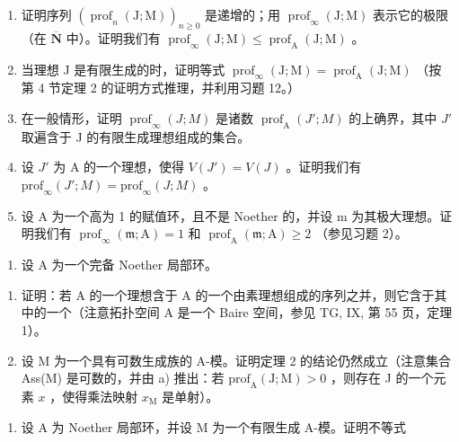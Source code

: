 \begin{enumerate}
\def\labelenumi{\alph{enumi})}
\item
  证明序列 \(\left(\operatorname{prof}_{n}(\mathrm{J};\mathrm{M})\right)_{n\geqslant0}\) 是递增的；用 \(\operatorname{prof}_{\infty}(\mathrm{J};\mathrm{M})\) 表示它的极限（在 \(\overline{\mathbf{N}}\) 中）。证明我们有 \(\operatorname{prof}_{\infty}(\mathrm{J};\mathrm{M})\leqslant\operatorname{prof}_{\mathrm{A}}(\mathrm{J};\mathrm{M})\) 。
\item
  当理想 J 是有限生成的时，证明等式 \(\operatorname{prof}_{\infty}(\mathrm{J};\mathrm{M})=\operatorname{prof}_{\mathrm{A}}(\mathrm{J};\mathrm{M})\) （按第 4 节定理 2 的证明方式推理，并利用习题 12。）
\item
  在一般情形，证明 \(\operatorname{prof}_{\infty}(J;M)\) 是诸数 \(\operatorname{prof}_{\mathrm{A}}(J';M)\) 的上确界，其中 \(J'\) 取遍含于 J 的有限生成理想组成的集合。
\item
  设 \(J'\) 为 A 的一个理想，使得 \(V(J') = V(J)\) 。证明我们有 \(\text{prof}_{\infty}(J'; M) = \text{prof}_{\infty}(J; M)\) 。
\item
  设 A 为一个高为 1 的赋值环，且不是 Noether 的，并设 m 为其极大理想。证明我们有 \(\operatorname{prof}_{\infty}(\mathfrak{m};\mathrm{A})=1\) 和 \(\operatorname{prof}_{\mathrm{A}}(\mathfrak{m};\mathrm{A})\geqslant2\) （参见习题 2）。
\end{enumerate}

\begin{enumerate}
\def\labelenumi{\arabic{enumi})}
\setcounter{enumi}{13}
\tightlist
\item
  设 A 为一个完备 Noether 局部环。
\end{enumerate}

\begin{enumerate}
\def\labelenumi{\alph{enumi})}
\item
  证明：若 A 的一个理想含于 A 的一个由素理想组成的序列之并，则它含于其中的一个（注意拓扑空间 A 是一个 Baire 空间，参见 TG, IX, 第 55 页，定理 1）。
\item
  设 M 为一个具有可数生成族的 A-模。证明定理 2 的结论仍然成立（注意集合 Ass(M) 是可数的，并由 a) 推出：若 \(\mathrm{prof}_{\mathrm{A}}(\mathrm{J};\mathrm{M}) > 0\) ，则存在 J 的一个元素 \(x\) ，使得乘法映射 \(x_{\mathrm{M}}\) 是单射）。
\end{enumerate}

\begin{enumerate}
\def\labelenumi{\arabic{enumi})}
\setcounter{enumi}{14}
\tightlist
\item
  设 A 为 Noether 局部环，并设 M 为一个有限生成 A-模。证明不等式
\end{enumerate}

